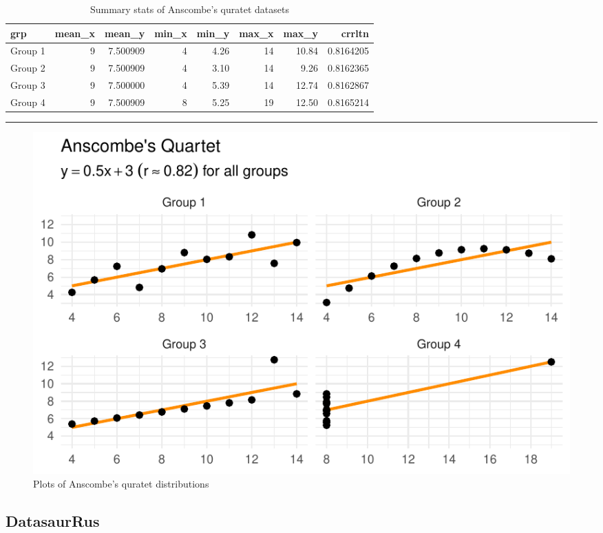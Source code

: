\documentclass[
  letterpaper,
  DIV=11]{scrartcl}
\begin{document}
\hypertarget{tbl-anscombe}{}
\begin{table}
\caption{\label{tbl-anscombe}Summary stats of Anscombe's quratet datasets }\tabularnewline

\centering\begingroup\fontsize{20}{22}\selectfont

\begin{tabular}{l|r|r|r|r|r|r|r}
\hline
grp & mean\_x & mean\_y & min\_x & min\_y & max\_x & max\_y & crrltn\\
\hline
Group 1 & 9 & 7.500909 & 4 & 4.26 & 14 & 10.84 & 0.8164205\\
\hline
Group 2 & 9 & 7.500909 & 4 & 3.10 & 14 & 9.26 & 0.8162365\\
\hline
Group 3 & 9 & 7.500000 & 4 & 5.39 & 14 & 12.74 & 0.8162867\\
\hline
Group 4 & 9 & 7.500909 & 8 & 5.25 & 19 & 12.50 & 0.8165214\\
\hline
\end{tabular}
\endgroup{}
\end{table}

\begin{center}\rule{0.5\linewidth}{0.5pt}\end{center}

\begin{figure}

{\centering \includegraphics{_descr_stats_DE_files/figure-pdf/fig-anscombe-1.pdf}

}

\caption{\label{fig-anscombe}Plots of Anscombe's quratet distributions}

\end{figure}

\hypertarget{datasaurrus}{%
\subsection{DatasaurRus}\label{datasaurrus}}
\end{document}
